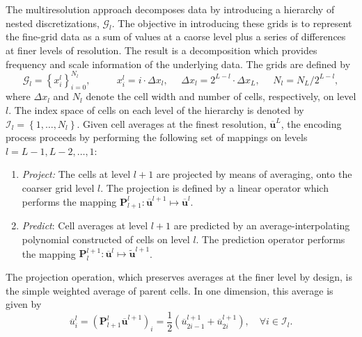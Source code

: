 \documentclass[]{article}
\begin{document}
        The multiresolution approach decomposes data by introducing a hierarchy of
        nested discretizations, $\bm{\mathcal{G}}_{l}$. The objective in
        introducing these grids is to represent the fine-grid data as a sum of
        values at a caorse level plus a series of differences at finer levels of
        resolution.  The result is a decomposition which provides frequency and
        scale information of the underlying data. The grids are defined by
        \begin{equation}
            \bm{\mathcal{G}}_{l} = \left\{ x_{i}^{l} \right\}_{i=0}^{N_{l}}, \text{ }
            \text{ } \text{ } \text{ } x_{i}^{l} = i \cdot \Delta x_{l}, \text{ }
            \text{ } \Delta x_{l} = 2^{L-l} \cdot \Delta x_{L}, \text{ } \text{ } N_{l} = N_{L}
            / 2^{L-l},
        \end{equation}
        where $\Delta x_{l}$ and $N_{l}$ denote the cell width and number of cells,
        respectively, on level $l$. The index space of cells on each level of the
        hierarchy is denoted by $\bm{\mathcal{I}}_{l} = \left\{ 1,\dots,N_{l}
        \right\}$. Given cell averages at the finest resolution,
        $\bm{\overline{u}}^{L}$, the encoding process proceeds by performing the
        following set of mappings on levels $l = L-1,L-2,\dots,1$:
        \begin{enumerate}
            \item[] \textit{Project:} The cells at level $l+1$ are projected
                by means of averaging, onto the coarser grid
                level $l$. The projection is defined by a linear operator
                which performs the mapping $\bm{P}_{l+1}^{l} : \overline{\bm{u}}^{l+1}
                \mapsto \overline{\bm{u}}^{l}$.
            \item[] \textit{Predict}: Cell averages at level $l+1$
                are predicted by an average-interpolating polynomial constructed
                of cells on level $l$. The prediction operator performs
                the mapping $\bm{P}_{l}^{l+1} : \overline{\bm{u}}^{l} \mapsto
                \tilde{\bm{u}}^{l+1}$.
        \end{enumerate}
        The projection operation, which preserves averages at the finer level
        by design, is the simple weighted average of parent cells.  In one
        dimension, this average is given by
        \begin{equation}
            \overline{u}^{l}_{i} = \left( \bm{P}_{l+1}^{l}
            \overline{\bm{u}}^{l+1} \right)_{i} = \frac{1}{2} (
            \overline{u}^{l+1}_{2i-1} + \overline{u}^{l+1}_{2i} ), \quad \forall
            i \in \bm{\mathcal{I}}_{l}.
        \end{equation}
\end{document}
